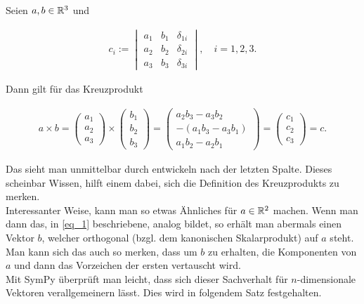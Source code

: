 \begin{remark*}

Seien $a, b \in \mathbb{R}^3$ und

\begin{align} \label{eq_1}
  c_i
  :=
  \begin{vmatrix}
    a_1 & b_1 & \delta_{1 i} \\
    a_2 & b_2 & \delta_{2 i} \\
    a_3 & b_3 & \delta_{3 i}
  \end{vmatrix},
  \quad
  i = 1, 2, 3.
\end{align}

Dann gilt für das Kreuzprodukt

\begin{align*}
  a \times b
  =
  \begin{pmatrix}
    a_1 \\
    a_2 \\
    a_3
  \end{pmatrix}
  \times
  \begin{pmatrix}
  b_1 \\
  b_2 \\
  b_3
  \end{pmatrix}
  =
  \begin{pmatrix}
      a_2 b_3 - a_3 b_2 \\
    -(a_1 b_3 - a_3 b_1) \\
      a_1 b_2 - a_2 b_1
  \end{pmatrix}
  =
  \begin{pmatrix}
    c_1 \\
    c_2 \\
    c_3
  \end{pmatrix}
  = c.
\end{align*}

Das sieht man unmittelbar durch entwickeln nach der letzten Spalte.
Dieses scheinbar  Wissen, hilft einem dabei, sich die Definition des Kreuzprodukts zu merken. \\

Interessanter Weise, kann man so etwas Ähnliches für $a \in \mathbb{R}^2$ machen.
Wenn man dann das, in \eqref{eq_1} beschriebene,  analog bildet, so erhält man abermals einen Vektor $b$, welcher orthogonal (bzgl. dem kanonischen Skalarprodukt) auf $a$ steht.
Man kann sich das auch so merken, dass um $b$ zu erhalten, die Komponenten von $a$ und dann das Vorzeichen der ersten vertauscht wird. \\

Mit SymPy überprüft man leicht, dass sich dieser Sachverhalt für $n$-dimensionale Vektoren verallgemeinern lässt.
Dies wird in folgendem Satz festgehalten.

\end{remark*}
